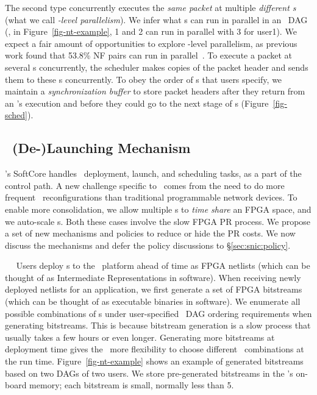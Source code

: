 The second type concurrently executes the {\em same packet} at multiple {\em different \nt{}s} (what we call {\em \nt-level parallelism}).
We infer what \nt{}s can run in parallel in an \nt\ DAG (\eg, in Figure~\ref{fig-nt-example}, \nt{}1 and \nt{}2 can run in parallel with \nt{}3 for user1).
We expect a fair amount of opportunities to explore \nt-level parallelism, as previous work found that 53.8\% NF pairs can run in parallel~\cite{NFP-sigcomm17}.
To execute a packet at several \nt{}s concurrently, the scheduler makes copies of the packet header and sends them to these \nt{}s concurrently. To obey the order of \nt{}s that users specify, we maintain a {\em synchronization buffer} to store packet headers after they return from an \nt{}'s execution and before they could go to the next stage of \nt{}s (Figure~\ref{fig-sched}).



\subsection{\nt\ (De-)Launching Mechanism}
\label{sec:snic:ntsched}
\snic's SoftCore handles \nt\ deployment, launch, and scheduling tasks, as a part of the control path.
A new challenge specific to \snic\ comes from the need to do more frequent \nt\ reconfigurations than traditional programmable network devices.
To enable more consolidation, we allow multiple \nt{}s to {\em time share} an FPGA space, and we auto-scale \nt{}s.
Both these cases involve the slow FPGA PR process.
We propose a set of new mechanisms and policies to reduce or hide the PR costs.
We now discuss the mechanisms and defer the policy discussions to \S\ref{sec:snic:policy}.

~~
Users deploy \nt{}s to the \snic\ platform ahead of time as FPGA netlists (which can be thought of as Intermediate Representations in software).
When receiving newly deployed \nt{} netlists for an application, we first generate a set of FPGA bitstreams (which can be thought of as executable binaries in software).
We enumerate all possible combinations of \nt{}s under user-specified \nt\ DAG ordering requirements when generating bitstreams. 
This is because bitstream generation is a slow process that usually takes a few hours or even longer. 
Generating more bitstreams at deployment time gives the \snic\ more flexibility to choose different \nt\ combinations at the run time. 
Figure~\ref{fig-nt-example} shows an example of generated bitstreams based on two DAGs of two users.
We store pre-generated bitstreams in the \snic{}'s on-board memory; each bitstream is small, normally less than 5\MB.

